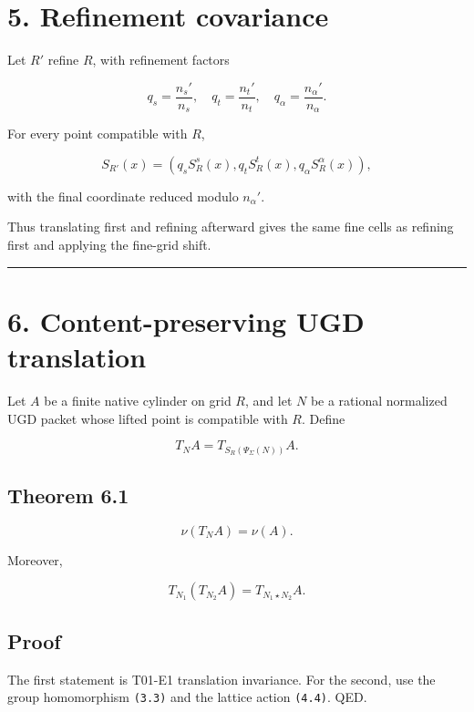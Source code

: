 \hypertarget{refinement-covariance}{%
\section{5. Refinement covariance}\label{refinement-covariance}}

Let \(R'\) refine \(R\), with refinement factors

\[
q_s=\frac{n_s'}{n_s},
\quad
q_t=\frac{n_t'}{n_t},
\quad
q_\alpha=\frac{n_\alpha'}{n_\alpha}.
\]

For every point compatible with \(R\),

\[
\boxed{
S_{R'}(x)
=
(q_sS_R^s(x),q_tS_R^t(x),q_\alpha S_R^\alpha(x)),
}
\tag{5.1}
\]

with the final coordinate reduced modulo \(n_\alpha'\).

Thus translating first and refining afterward gives the same fine cells as
refining first and applying the fine-grid shift.

\begin{center}\rule{0.5\linewidth}{0.5pt}\end{center}

\hypertarget{content-preserving-ugd-translation}{%
\section{6. Content-preserving UGD translation}\label{content-preserving-ugd-translation}}

Let \(A\) be a finite native cylinder on grid \(R\), and let \(N\) be a rational
normalized UGD packet whose lifted point is compatible with \(R\). Define

\[
T_NA
=
T_{S_R(\Psi_\Sigma(N))}A.
\tag{6.1}
\]

\hypertarget{theorem-6.1}{%
\subsection{Theorem 6.1}\label{theorem-6.1}}

\[
\boxed{
\nu(T_NA)=\nu(A).
}
\tag{6.2}
\]

Moreover,

\[
T_{N_1}(T_{N_2}A)
=
T_{N_1\star N_2}A.
\tag{6.3}
\]

\hypertarget{proof-3}{%
\subsection{Proof}\label{proof-3}}

The first statement is T01-E1 translation invariance. For the second, use the
group homomorphism \texttt{(3.3)} and the lattice action \texttt{(4.4)}. QED.

